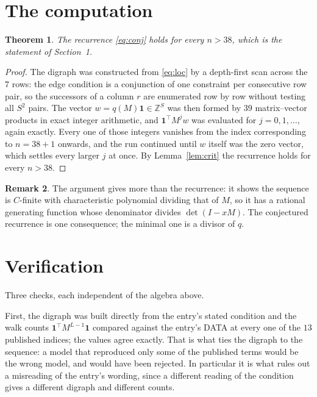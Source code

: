 \documentclass[11pt,a4paper]{article}
\theoremstyle{plain}
\newtheorem{theorem}{Theorem}
\theoremstyle{definition}
\newtheorem{remark}[theorem]{Remark}
\begin{document}
\section{The computation}

\begin{theorem}
The recurrence \eqref{eq:conj} holds for every $n>38$, which is the statement of
Section~1.
\end{theorem}

\begin{proof}
The digraph was constructed from \eqref{eq:loc} by a depth-first scan across the $7$
rows: the edge condition is a conjunction of one constraint per consecutive row
pair, so the successors of a column $r$ are enumerated row by row without testing all
$S^2$ pairs. The vector $w=q(M)\mathbf{1}\in\mathbb{Z}^{S}$ was then formed by $39$
matrix--vector products in exact integer arithmetic, and $\mathbf{1}^{\!\top}M^{j}w$ was
evaluated for $j=0,1,\dots$, again exactly. Every one of those integers vanishes from the
index corresponding to $n=38+1$ onwards, and the run continued until $w$ itself was the
zero vector, which settles every larger $j$ at once. By Lemma~\ref{lem:crit} the recurrence
holds for every $n>38$.
\end{proof}

\begin{remark}
The argument gives more than the recurrence: it shows the sequence is $C$-finite with
characteristic polynomial dividing that of $M$, so it has a rational generating function
whose denominator divides $\det(I-xM)$. The conjectured recurrence is one consequence; the
minimal one is a divisor of $q$.
\end{remark}

\section{Verification}

Three checks, each independent of the algebra above.

First, the digraph was built directly from the entry's stated condition and the walk counts
$\mathbf{1}^{\!\top}M^{L-1}\mathbf{1}$ compared against the entry's DATA at
every one of the $13$ published indices; the values agree exactly. That is what ties
the digraph to the sequence: a model that reproduced only some of the published terms would
be the wrong model, and would have been rejected. In particular it is what rules out a
misreading of the entry's wording, since a different reading of the condition gives a
different digraph and different counts.
\end{document}

